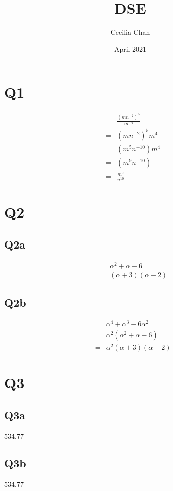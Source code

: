 \documentclass{article}
\title{DSE}
\author{Cecilia Chan}
\date{April 2021}
\begin{document}
\maketitle


\section{Q1}
\begin{eqnarray*}
  & & \frac{(mn^{-2})^5}{m^{-4}} \\
  &=& (mn^{-2})^5m^4 \\
  &=& (m^5n^{-10})m^4 \\
  &=& (m^9n^{-10}) \\
  &=& \frac{m^9}{n^{10}}
\end{eqnarray*}

\section{Q2}
\subsection{Q2a}
\begin{eqnarray*}
  & & \alpha^2 + \alpha - 6 \\
  &=& (\alpha + 3)(\alpha - 2)
\end{eqnarray*}

\subsection{Q2b}
\begin{eqnarray*}
  & & \alpha^4 + \alpha^3 - 6\alpha^2 \\
  &=& \alpha^2(\alpha^2 + \alpha - 6) \\
  &=& \alpha^2 (\alpha + 3)(\alpha - 2)
\end{eqnarray*}

\section{Q3}
\subsection{Q3a}
534.77
\subsection{Q3b}
534.77
\end{document}
